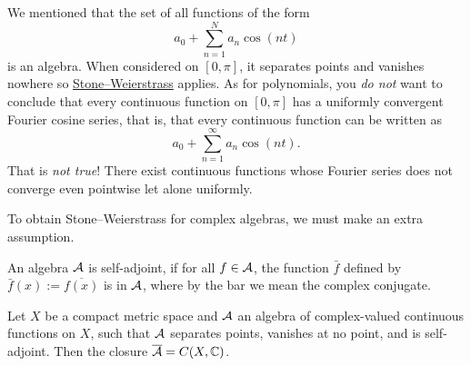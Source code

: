 \begin{example}
We mentioned that the set of all functions of the form
\begin{equation*}
a_0 +
\sum_{n=1}^N a_n \cos(nt)
\end{equation*}
is an algebra.
When considered on $[0,\pi]$, 
it separates points and vanishes nowhere so
\hyperref[thm:SWreal]{Stone--Weierstrass} applies.
As for polynomials, you \emph{do not} want to conclude that every continuous
function on $[0,\pi]$ has a uniformly convergent
Fourier cosine series, that is, that every continuous
function can be written as
\begin{equation*}
a_0 +
\sum_{n=1}^\infty a_n \cos(nt) .
\end{equation*}
That is \emph{not true}!
There exist continuous functions
whose Fourier series does not converge even pointwise
let alone uniformly.
\end{example}

To obtain Stone--Weierstrass for complex algebras, we must
make an extra assumption.

\begin{defn}
An algebra ${\mathcal{A}}$ is self-adjoint, if for all $f \in {\mathcal{A}}$, the function
$\bar{f}$ defined by $\bar{f}(x) := \overline{f(x)}$ is in ${\mathcal{A}}$, where by the
bar we mean the complex conjugate.
\end{defn}

\begin{thm}
\label{thm:SWcomplex}
Let $X$ be a compact metric space and ${\mathcal{A}}$ an algebra of complex-valued
continuous functions on $X$, such that ${\mathcal{A}}$ separates points, vanishes at
no point, and is self-adjoint.  Then the closure $\overline{{\mathcal{A}}} = C(X,{\mathbb{C}})$.
\end{thm}

